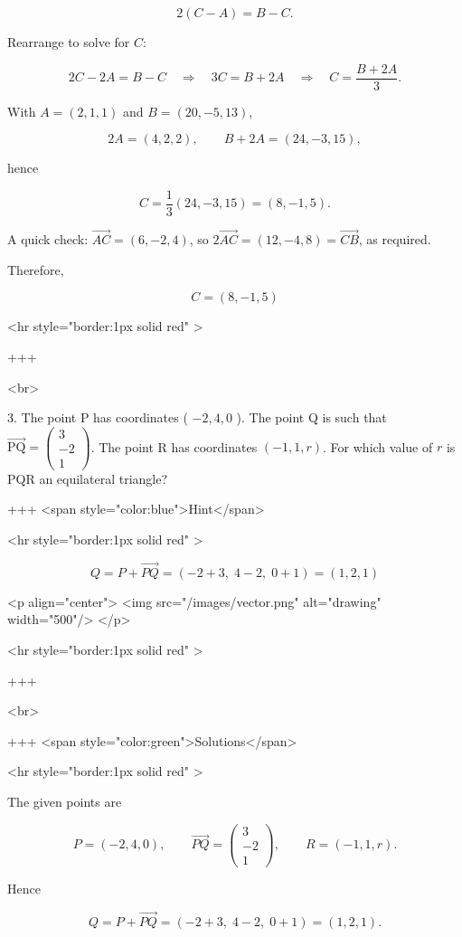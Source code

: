 $$
2(C-A)=B-C.
$$

Rearrange to solve for $C$:

$$
2C-2A=B-C \quad\Longrightarrow\quad 3C=B+2A \quad\Longrightarrow\quad C=\frac{B+2A}{3}.
$$

With $A=(2,1,1)$ and $B=(20,-5,13)$,

$$
2A=(4,2,2),\qquad B+2A=(24,-3,15),
$$

hence

$$
C=\frac{1}{3}(24,-3,15)=(8,-1,5).
$$


A quick check: $\overrightarrow{AC}=(6,-2,4)$, so $2\overrightarrow{AC}=(12,-4,8)=\overrightarrow{CB}$, as required.

Therefore,

$$
C=(8,-1,5)
$$

<hr style="border:1px solid red" >

+++

<br>

3. The point P has coordinates ( $-2,4,0$ ).
The point Q is such that $\overrightarrow{\mathrm{PQ}}=\left(\begin{array}{c}3 \\ -2 \\ 1\end{array}\right)$.
The point R has coordinates $(-1,1, r)$.
For which value of $r$ is PQR an equilateral triangle?

+++ <span style="color:blue">Hint</span>

<hr style="border:1px solid red" >

$$
Q=P+\overrightarrow{PQ}=( -2+3,\;4-2,\;0+1)=(1,2,1)
$$

<p align="center">
<img src="/images/vector.png" alt="drawing" width="500"/>
</p>

<hr style="border:1px solid red" >

+++

<br>

+++ <span style="color:green">Solutions</span>

<hr style="border:1px solid red" >

The given points are

$$
P=(-2,4,0),\qquad \overrightarrow{PQ}=\begin{pmatrix}3\\-2\\1\end{pmatrix},
\qquad R=(-1,1,r).
$$

Hence

$$
Q=P+\overrightarrow{PQ}=( -2+3,\;4-2,\;0+1)=(1,2,1).
$$


